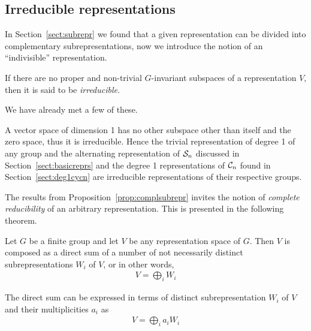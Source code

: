 \subsection{Irreducible representations}

In Section~\ref{sect:subrepr} we found that a given representation can be divided into complementary subrepresentations, now we introduce the notion of an ``indivisible'' representation.

\begin{definition}
	If there are no proper and non-trivial $G$-invariant subspaces of a representation $V$, then it is said to be \textit{irreducible}. 
\end{definition}

We have already met a few of these.

\begin{example}\cite[Example 1.4.2.]{Sagan}
	A vector space of dimension 1 has no other subspace other than itself and the zero space, thus it is irreducible. Hence the trivial representation of degree 1 of any group and the alternating representation of $\mathcal{S}_n$ discussed in Section~\ref{sect:basicreprs} and the degree 1 representations of $\mathcal{C}_n$ found in Section~\ref{sect:deg1cycn} are irreducible representations of their respective groups.
\end{example}

The results from Proposition~\ref{prop:complsubrepr} invites the notion of \textit{complete reducibility} of an arbitrary representation. This is presented in the following theorem.

\begin{theorem}\label{thm:maschkes}
	Let $G$ be a finite group and let $V$ be any representation space of $G$. Then $V$ is composed as a direct sum of a number of not necessarily distinct subrepresentations $W_i$ of $V$, or in other words,
	\begin{align*}
		V = \bigoplus_i W_i
	\end{align*}
	\begin{note}
		The direct sum can be expressed in terms of distinct subrepresentation $W_i$ of $V$ and their multiplicities $a_i$ as
		\begin{align*}
			V = \bigoplus_i a_i W_i
		\end{align*}
	\end{note}
\end{theorem}

